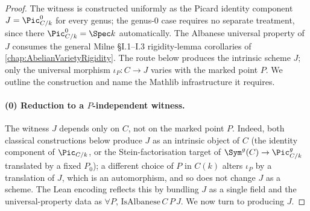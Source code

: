 \begin{proof}

\leanok
  The witness is constructed uniformly as the Picard identity component \(J = \Pic^0_{C/k}\) for every genus; the genus-\(0\) case requires no separate treatment, since there \(\Pic^0_{C/k} = \Spec k\) automatically. The Albanese universal property of \(J\) consumes the general Milne \S I.1--I.3 rigidity-lemma corollaries of \cref{chap:AbelianVarietyRigidity}. The route below produces the intrinsic scheme \(J\); only the universal morphism \(\iota_P \colon C \to J\) varies with the marked point \(P\). We outline the construction and name the Mathlib infrastructure it requires.
  \paragraph{(0) Reduction to a \(P\)-independent witness.}
  The witness \(J\) depends only on \(C\), not on the marked point \(P\). Indeed, both classical constructions below produce \(J\) as an intrinsic object of \(C\) (the identity component of \(\Pic_{C/k}\), or the Stein-factorisation target of \(\Sym^g(C) \to \Pic^g_{C/k}\) translated by a fixed \(P_0\)); a different choice of \(P\) in \(C(k)\) alters \(\iota_P\) by a translation of \(J\), which is an automorphism, and so does not change \(J\) as a scheme. The Lean encoding reflects this by bundling \(J\) as a single field and the universal-property data as \(\forall P,\, \mathrm{IsAlbanese}\, C\, P\, J\). We now turn to producing \(J\).

\end{proof}
